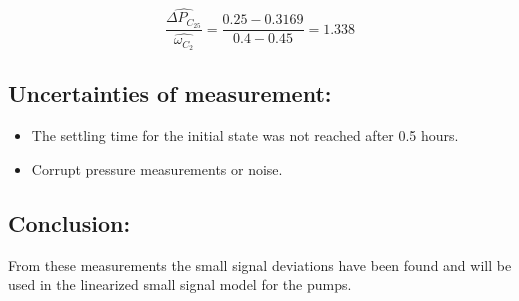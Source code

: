 \begin{equation}
\frac{\hat{\Delta P_{C_25}}}{\hat{\omega_{C_2}}} = \frac{0.25 - 0.3169}{0.4-0.45} = 1.338
\label{eq:smallsig_diff_pres4}
\end{equation}


\subsection*{Uncertainties of measurement:}
\begin{itemize}
\item The settling time for the initial state was not reached after 0.5 hours.
\item Corrupt pressure measurements or noise. 
\end{itemize}

\subsection*{Conclusion:}
From these measurements the small signal deviations have been found and will be used in the linearized small signal model for the pumps. 


